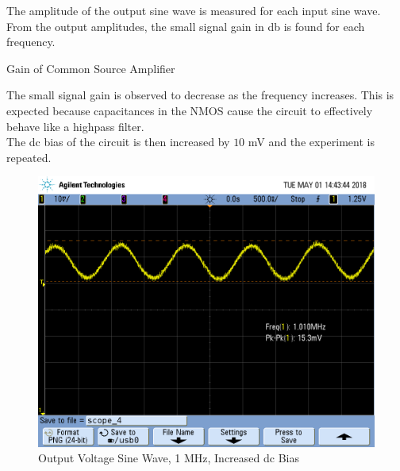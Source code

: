 \FloatBarrier

The amplitude of the output sine wave is measured for each input sine wave. 
From the output amplitudes, the small signal gain in \si{\decibel} is found for each frequency.

\FloatBarrier

\begin{table}[h!]
	\centering
	\caption{Gain of Common Source Amplifier}
	\label{tab:gain_part2}
\end{table}

\FloatBarrier

The small signal gain is observed to decrease as the frequency increases.
This is expected because capacitances in the NMOS cause the circuit to effectively behave like a highpass filter. \\

The dc bias of the circuit is then increased by $10$ \si{\milli\volt} and the experiment is repeated.

\FloatBarrier

\begin{figure}[h!]
	\centering
	\includegraphics[scale=0.3]{./images/SCOPE_4.PNG}
	\caption{Output Voltage Sine Wave, 1 \si{\mega\hertz}, Increased dc Bias}
	\label{fig:1mhz_original}
\end{figure}

\FloatBarrier

